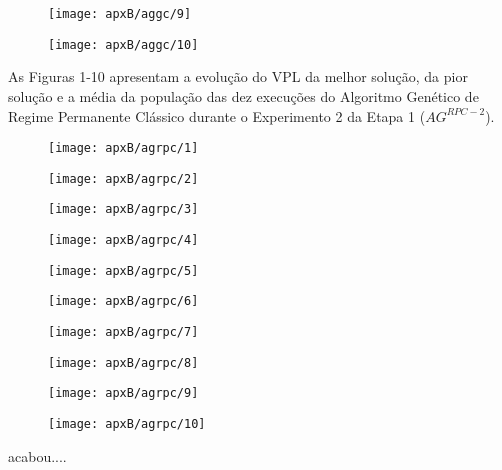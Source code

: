 \begin{figure}[H]
\centering

\texttt{[image: apxB/aggc/9]}

\end{figure}

\begin{figure}[H]
\centering

\texttt{[image: apxB/aggc/10]}

\end{figure}

As Figuras 1-10 apresentam a evolução do VPL da melhor solução, da pior solução e a média da população das dez execuções do Algoritmo Genético de Regime Permanente Clássico durante o Experimento 2 da Etapa 1 ($AG^{RPC-2}$).

\begin{figure}[H]
\centering

\texttt{[image: apxB/agrpc/1]}

\end{figure}

\begin{figure}[H]
\centering

\texttt{[image: apxB/agrpc/2]}

\end{figure}

\begin{figure}[H]
\centering

\texttt{[image: apxB/agrpc/3]}

\end{figure}

\begin{figure}[H]
\centering

\texttt{[image: apxB/agrpc/4]}

\end{figure}

\begin{figure}[H]
\centering

\texttt{[image: apxB/agrpc/5]}

\end{figure}

\begin{figure}[H]
\centering

\texttt{[image: apxB/agrpc/6]}

\end{figure}

\begin{figure}[H]
\centering

\texttt{[image: apxB/agrpc/7]}

\end{figure}

\begin{figure}[H]
\centering

\texttt{[image: apxB/agrpc/8]}

\end{figure}


\begin{figure}[H]
\centering

\texttt{[image: apxB/agrpc/9]}

\end{figure}

\begin{figure}[H]
\centering

\texttt{[image: apxB/agrpc/10]}

\end{figure}

acabou....